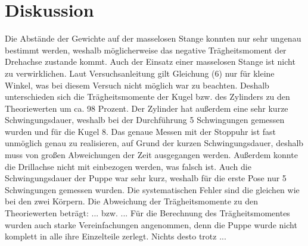 \section{Diskussion}
\label{sec:Diskussion}

Die Abstände der Gewichte auf der masselosen Stange konnten nur
sehr ungenau bestimmt werden, weshalb möglicherweise das negative Trägheitsmoment
der Drehachse zustande kommt. Auch der Einsatz einer masselosen Stange ist nicht
zu verwirklichen. 
Laut Versuchsanleitung gilt Gleichung (6) nur für kleine Winkel, was 
bei diesem Versuch nicht möglich war zu beachten. Deshalb unterschieden sich
die Trägheitsmomente der Kugel bzw. des Zylinders zu den Theoriewerten um
ca. 98 Prozent. Der Zylinder hat außerdem eine sehr kurze Schwingungsdauer,
weshalb bei der Durchführung 5 Schwingungen gemessen wurden und für die Kugel 8.
Das genaue Messen mit der Stoppuhr ist fast unmöglich genau zu realisieren, auf Grund der 
kurzen Schwingungsdauer, deshalb muss von großen Abweichungen der Zeit ausgegangen werden.
Außerdem konnte die Drillachse nicht mit einbezogen werden, was falsch ist.
Auch die Schwingungsdauer der Puppe war sehr kurz, weshalb für die erste Pose nur 5 Schwingungen gemessen wurden.
Die systematischen Fehler sind die gleichen wie bei den zwei Körpern.
Die Abweichung der Trägheitsmomente zu den Theoriewerten beträgt: ... bzw. ...
Für die Berechnung des Trägheitsmomentes wurden auch starke Vereinfachungen angenommen,
denn die Puppe wurde nicht komplett in alle ihre Einzelteile zerlegt. Nichts desto trotz ...
